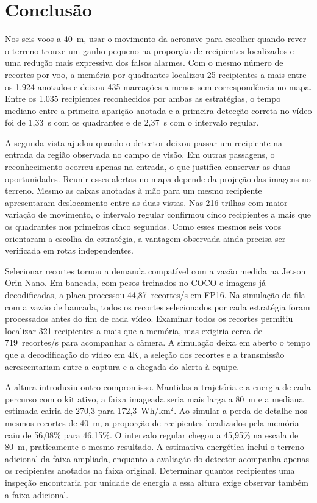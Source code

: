 \chapter{Conclusão}
\label{cap_conclusao}

Nos seis voos a 40~m, usar o movimento da aeronave para escolher quando rever o terreno trouxe um ganho pequeno na proporção de recipientes localizados e uma redução mais expressiva dos falsos alarmes. Com o mesmo número de recortes por voo, a memória por quadrantes localizou 25 recipientes a mais entre os 1.924 anotados e deixou 435 marcações a menos sem correspondência no mapa. Entre os 1.035 recipientes reconhecidos por ambas as estratégias, o tempo mediano entre a primeira aparição anotada e a primeira detecção correta no vídeo foi de 1,33~s com os quadrantes e de 2,37~s com o intervalo regular.

A segunda vista ajudou quando o detector deixou passar um recipiente na entrada da região observada no campo de visão. Em outras passagens, o reconhecimento ocorreu apenas na entrada, o que justifica conservar as duas oportunidades. Reunir esses alertas no mapa depende da projeção das imagens no terreno. Mesmo as caixas anotadas à mão para um mesmo recipiente apresentaram deslocamento entre as duas vistas. Nas 216 trilhas com maior variação de movimento, o intervalo regular confirmou cinco recipientes a mais que os quadrantes nos primeiros cinco segundos. Como esses mesmos seis voos orientaram a escolha da estratégia, a vantagem observada ainda precisa ser verificada em rotas independentes.

Selecionar recortes tornou a demanda compatível com a vazão medida na Jetson Orin Nano. Em bancada, com pesos treinados no COCO e imagens já decodificadas, a placa processou 44,87~recortes/s em FP16. Na simulação da fila com a vazão de bancada, todos os recortes selecionados por cada estratégia foram processados antes do fim de cada vídeo. Examinar todos os recortes permitiu localizar 321 recipientes a mais que a memória, mas exigiria cerca de 719~recortes/s para acompanhar a câmera. A simulação deixa em aberto o tempo que a decodificação do vídeo em 4K, a seleção dos recortes e a transmissão acrescentariam entre a captura e a chegada do alerta à equipe.

A altura introduziu outro compromisso. Mantidas a trajetória e a energia de cada percurso com o kit ativo, a faixa imageada seria mais larga a 80~m e a mediana estimada cairia de 270,3 para 172,3~Wh/km$^2$. Ao simular a perda de detalhe nos mesmos recortes de 40~m, a proporção de recipientes localizados pela memória caiu de 56,08\% para 46,15\%. O intervalo regular chegou a 45,95\% na escala de 80~m, praticamente o mesmo resultado. A estimativa energética inclui o terreno adicional da faixa ampliada, enquanto a avaliação do detector acompanha apenas os recipientes anotados na faixa original. Determinar quantos recipientes uma inspeção encontraria por unidade de energia a essa altura exige observar também a faixa adicional.

